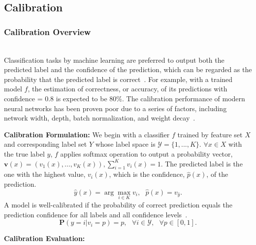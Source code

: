 \subsection{Calibration}
\subsubsection{Calibration Overview}\hfill\\
Classification tasks by machine learning are preferred to output both the predicted label and the confidence of the prediction, which can be regarded as the probability that the predicted label is correct~\cite{vasilev2023calibration}. For example, with a trained model $f$, the estimation of correctness, or accuracy, of its predictions with confidence = 0.8 is expected to be 80$\%$. The calibration performance of modern neural networks has been proven poor due to a series of factors, including network width, depth, batch normalization, and weight decay~\cite{guo2017calibration}.

\textbf{Calibration Formulation:} We begin with a classifier $f$ trained by feature set $X$ and corresponding label set $Y$ whose label space is $\mathcal{Y} = \{1,..., K\}$. $\forall x \in X$ with the true label $y$, $f$ applies softmax operation to output a probability vector, $\textbf{v}(x)=(v_1(x),...,v_K(x)),\sum_{i=1}^Kv_i(x)=1$. The predicted label is the one with the highest value, $v_i(x)$, which is the confidence, $\hat{p}(x)$, of the prediction.
\begin{equation}
    \hat{y}(x)=\arg \max_{i\in K} v_i,\text{ } \hat{p}(x)=v_{\hat{y}}.
\end{equation}
A model is well-calibrated if the probability of correct prediction equals the prediction confidence for all labels and all confidence levels~\cite{guo2017calibration}.
\begin{equation}\label{eq: well-calibrated}
    \mathbf{P}(y=i|v_i=p)=p, \text{ } \forall i \in \mathcal{Y}, \text{ } \forall p \in [0,1].
\end{equation}

\textbf{Calibration Evaluation:} 

